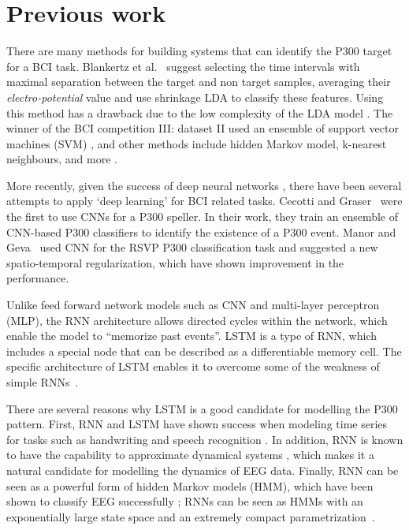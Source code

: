 \documentclass[
12pt, %
english, %
doublespacing, %
headsepline, %
]{MastersDoctoralThesis} %
\begin{document}
\chapter{Previous work}
There are many methods for building systems that can identify the P300 target for a BCI task. Blankertz et al.~\cite{P300_Tutorial} suggest 
selecting the time intervals with maximal separation between the target and non target samples, averaging their \textit{electro-potential} value and use shrinkage LDA to classify these features. Using this method has a drawback due to the low complexity of the LDA model \cite{cincotti2003comparison}. The winner of the BCI competition III: dataset II used an ensemble of support vector machines (SVM) \cite{P300SVMWinner}, and other methods include hidden Markov model, k-nearest neighbours, and more  \cite{cincotti2003comparison}.

More recently, given the success of deep neural networks \cite{krizhevsky2012imagenet}, there have been several attempts to apply `deep learning' for BCI related tasks. Cecotti and Graser~\cite{P300_CNN} were the first to use CNNs  for a P300 speller. In their work, they train an ensemble of CNN-based P300 classifiers to identify the existence of a P300 event. Manor and Geva~\cite{RSVP_P300_geva} used CNN for the RSVP P300 classification task and suggested a new spatio-temporal regularization, which have shown improvement in the performance.


Unlike feed forward network models such as CNN and multi-layer perceptron (MLP),  the RNN architecture allows directed cycles within the network, which enable the model to ``memorize past events''. LSTM \cite{LSTM_origin} is a type of RNN, which includes a special node that can be described as a differentiable memory cell. The specific architecture of LSTM enables it to overcome some of the weakness of simple RNNs~\cite{bengio1994learning}.

There are several reasons why LSTM is a good candidate for modelling the P300 pattern. First, RNN and LSTM have shown success when modeling time series for tasks such as handwriting and speech recognition \cite{graves2013speech,  graves2008unconstrained, yue2015beyond}. In addition, RNN is known to have the capability to approximate dynamical systems \cite{li2005approximation}, which makes it a natural candidate for modelling the dynamics of EEG data. Finally, RNN can be seen as a powerful form of hidden Markov models (HMM), which have been shown to classify EEG successfully \cite{solhjoo2005classification,obermaier2001hidden,cincotti2003comparison}; RNNs can be seen as HMMs with an exponentially large state space and an extremely compact parametrization~\cite{sutskever2009recurrent}.
\end{document}
